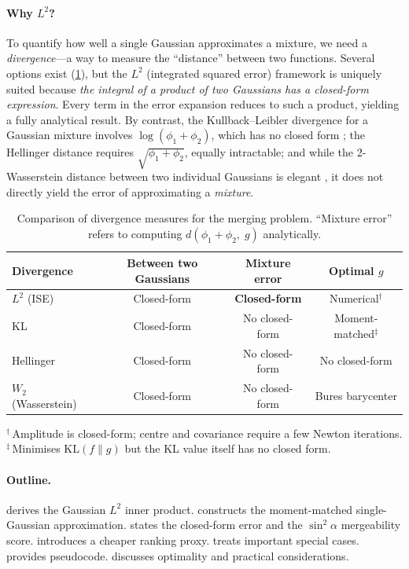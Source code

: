 \documentclass[11pt, a4paper]{article}
\theoremstyle{plain}
\theoremstyle{definition}
\theoremstyle{remark}
\begin{document}
\paragraph{Why \texorpdfstring{$L^2$}{L2}?}
To quantify how well a single Gaussian approximates a mixture, we
need a \emph{divergence}---a way to measure the ``distance'' between
two functions.  Several options exist (\cref{tab:divergences}), but
the $L^2$ (integrated squared error) framework is uniquely suited
because \emph{the integral of a product of two Gaussians has a
closed-form expression}.  Every term in the
error expansion reduces to such a product, yielding a fully analytical
result.  By contrast, the Kullback--Leibler divergence for a Gaussian
mixture involves $\log(\phi_1 + \phi_2)$, which has no closed form
\citep{hershey2007}; the Hellinger distance requires
$\sqrt{\phi_1 + \phi_2}$, equally intractable; and while the
2-Wasserstein distance between two individual Gaussians is elegant
\citep{jian2011}, it does not directly yield the error of
approximating a \emph{mixture}.

\begin{table}[ht]
\centering\small
\caption{Comparison of divergence measures for the merging problem.
  ``Mixture error'' refers to computing
  $d({\phi_1{+}\phi_2},\;g)$ analytically.}
\label{tab:divergences}
\begin{tabular}{@{}lccc@{}}
\toprule
\textbf{Divergence} & \textbf{Between two Gaussians} &
  \textbf{Mixture error} & \textbf{Optimal $g$} \\
\midrule
$L^2$ (ISE) & Closed-form & \textbf{Closed-form} & Numerical$^\dagger$ \\
KL & Closed-form & No closed-form & Moment-matched$^\ddagger$ \\
Hellinger & Closed-form & No closed-form & No closed-form \\
$W_2$ (Wasserstein) & Closed-form & No closed-form & Bures barycenter \\
\bottomrule
\end{tabular}

\vspace{4pt}
\raggedright\scriptsize
$^\dagger$\,Amplitude is closed-form; centre and covariance
require a few Newton iterations.\\
$^\ddagger$\,Minimises $\mathrm{KL}(f\|g)$ but the KL value itself
has no closed form.
\end{table}

\paragraph{Outline.}
 derives the Gaussian $L^2$ inner product.
 constructs the moment-matched single-Gaussian
approximation.   states the closed-form error and the
$\sin^2\!\alpha$ mergeability score.   introduces a
cheaper ranking proxy.   treats important special
cases.   provides pseudocode.
 discusses optimality and practical
considerations.
\end{document}
